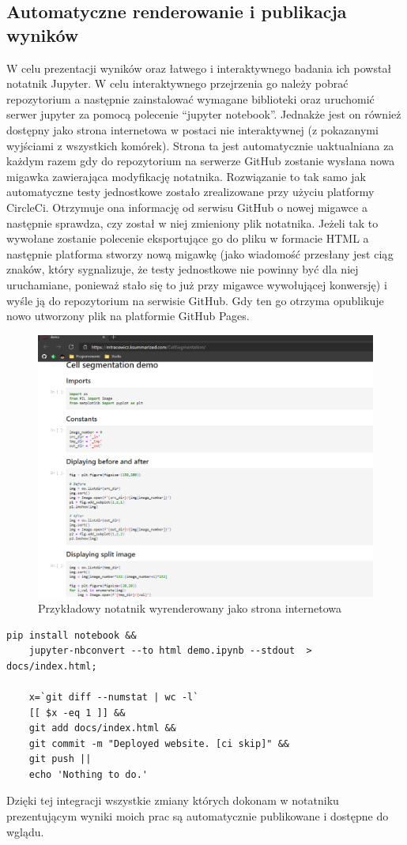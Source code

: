 \documentclass{article}
\begin{document}
\subsection{Automatyczne renderowanie i publikacja wyników}
W celu prezentacji wyników oraz łatwego i interaktywnego badania ich powstał notatnik Jupyter.
W celu interaktywnego przejrzenia go należy pobrać repozytorium a następnie zainstalować wymagane biblioteki oraz uruchomić serwer jupyter za pomocą polecenie ``jupyter notebook''.
Jednakże jest on również dostępny jako strona internetowa w postaci nie interaktywnej (z pokazanymi wyjściami z wszystkich komórek).
Strona ta jest automatycznie uaktualniana za każdym razem gdy do repozytorium na serwerze GitHub zostanie wysłana nowa migawka zawierająca modyfikację notatnika.
Rozwiązanie to tak samo jak automatyczne testy jednostkowe zostało zrealizowane przy użyciu platformy CircleCi.
Otrzymuje ona informację od serwisu GitHub o nowej migawce a następnie sprawdza, czy został w niej zmieniony plik notatnika.
Jeżeli tak to wywołane zostanie polecenie eksportujące go do pliku w formacie HTML a następnie platforma stworzy nową migawkę (jako wiadomość przesłany jest ciąg znaków, który sygnalizuje, że testy jednostkowe nie powinny być dla niej uruchamiane, ponieważ stało się to już przy migawce wywołującej konwersję) i wyśle ją do repozytorium na serwisie GitHub.
Gdy ten go otrzyma opublikuje nowo utworzony plik na platformie GitHub Pages.
\begin{figure}[H]
    \centering
    \includegraphics[width=\linewidth]{images/jupyter.png}
    \caption{Przykładowy notatnik wyrenderowany jako strona internetowa}
\end{figure}
\begin{lstlisting}[caption='Kod odpowiedzialny za konwersję notatnika do pliku html oraz jego warunkową publikację ']
    pip install notebook &&
    jupyter-nbconvert --to html demo.ipynb --stdout  > docs/index.html;

    x=`git diff --numstat | wc -l`
    [[ $x -eq 1 ]] &&
    git add docs/index.html &&
    git commit -m "Deployed website. [ci skip]" &&
    git push ||
    echo 'Nothing to do.'
\end{lstlisting}
Dzięki tej integracji wszystkie zmiany których dokonam w notatniku prezentującym wyniki moich prac są automatycznie publikowane i dostępne do wglądu.
\end{document}
